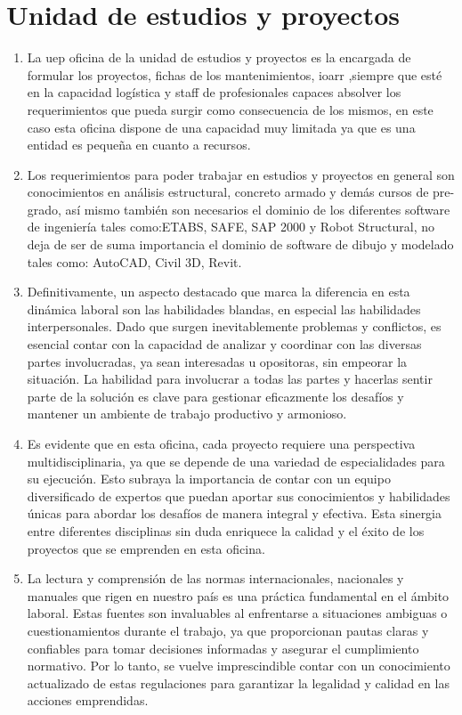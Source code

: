 \section{Unidad de estudios y proyectos}
\begin{enumerate}
	\item La \acrlong{uep} oficina de la unidad de estudios y proyectos es la encargada de formular los proyectos, fichas de los mantenimientos, \acrshort{ioarr} ,siempre que esté en la capacidad logística y staff de profesionales capaces absolver los requerimientos que pueda surgir como consecuencia de los mismos, en este caso esta oficina dispone de una capacidad muy limitada ya que es una entidad es pequeña en cuanto a recursos.
	\item Los requerimientos para poder trabajar en estudios y proyectos en general son conocimientos en análisis estructural, concreto armado y demás cursos de pre-grado, así mismo también son necesarios el dominio de los diferentes software de ingeniería tales como:ETABS, SAFE, SAP 2000 y Robot Structural, no deja de ser de suma importancia el dominio de software de dibujo y modelado tales como: AutoCAD, Civil 3D, Revit.
	\item Definitivamente, un aspecto destacado que marca la diferencia en esta dinámica laboral son las habilidades blandas, en especial las habilidades interpersonales. Dado que surgen inevitablemente problemas y conflictos, es esencial contar con la capacidad de analizar y coordinar con las diversas partes involucradas, ya sean interesadas u opositoras, sin empeorar la situación. La habilidad para involucrar a todas las partes y hacerlas sentir parte de la solución es clave para gestionar eficazmente los desafíos y mantener un ambiente de trabajo productivo y armonioso.
	\item Es evidente que en esta oficina, cada proyecto requiere una perspectiva multidisciplinaria, ya que se depende de una variedad de especialidades para su ejecución. Esto subraya la importancia de contar con un equipo diversificado de expertos que puedan aportar sus conocimientos y habilidades únicas para abordar los desafíos de manera integral y efectiva. Esta sinergia entre diferentes disciplinas sin duda enriquece la calidad y el éxito de los proyectos que se emprenden en esta oficina.
	\item La lectura y comprensión de las normas internacionales, nacionales y manuales que rigen en nuestro país es una práctica fundamental en el ámbito laboral. Estas fuentes son invaluables al enfrentarse a situaciones ambiguas o cuestionamientos durante el trabajo, ya que proporcionan pautas claras y confiables para tomar decisiones informadas y asegurar el cumplimiento normativo. Por lo tanto, se vuelve imprescindible contar con un conocimiento actualizado de estas regulaciones para garantizar la legalidad y calidad en las acciones emprendidas.
\end{enumerate}

